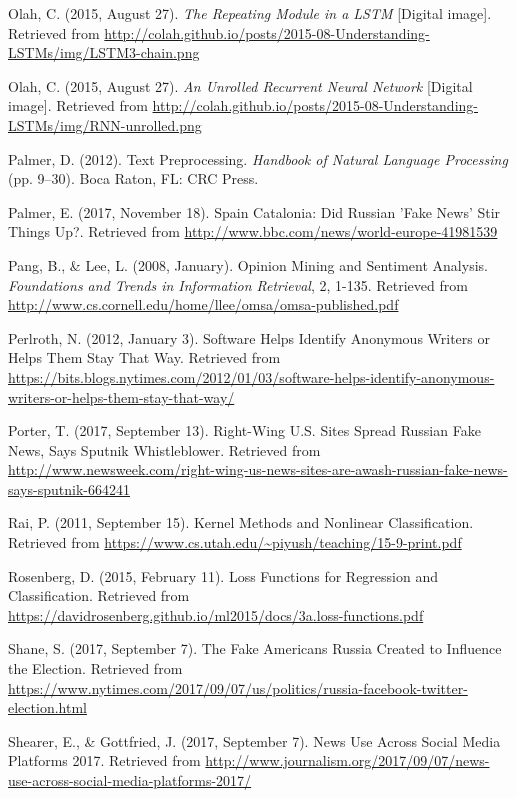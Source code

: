 \begin{thebibliography}{99}
Olah, C. (2015, August 27). \textit{The Repeating Module in a LSTM} [Digital image]. Retrieved from \url{http://colah.github.io/posts/2015-08-Understanding-LSTMs/img/LSTM3-chain.png}

Olah, C. (2015, August 27). \textit{An Unrolled Recurrent Neural Network} [Digital image]. Retrieved from \url{http://colah.github.io/posts/2015-08-Understanding-LSTMs/img/RNN-unrolled.png}

Palmer, D. (2012). Text Preprocessing. \textit{Handbook of Natural Language Processing} (pp. 9–30). Boca Raton, FL: CRC Press.

Palmer, E. (2017, November 18). Spain Catalonia: Did Russian 'Fake News' Stir Things Up?. Retrieved from \url{http://www.bbc.com/news/world-europe-41981539}

Pang, B., \& Lee, L. (2008, January). Opinion Mining and Sentiment Analysis. \textit{Foundations and Trends in Information Retrieval}, 2, 1-135. Retrieved from \url{http://www.cs.cornell.edu/home/llee/omsa/omsa-published.pdf}

Perlroth, N. (2012, January 3). Software Helps Identify Anonymous Writers or Helps Them Stay That Way. Retrieved from \url{https://bits.blogs.nytimes.com/2012/01/03/software-helps-identify-anonymous-writers-or-helps-them-stay-that-way/}

Porter, T. (2017, September 13). Right-Wing U.S. Sites Spread Russian Fake News, Says Sputnik Whistleblower. Retrieved from \url{http://www.newsweek.com/right-wing-us-news-sites-are-awash-russian-fake-news-says-sputnik-664241}

Rai, P. (2011, September 15). Kernel Methods and Nonlinear Classification. Retrieved from \url{https://www.cs.utah.edu/~piyush/teaching/15-9-print.pdf}

Rosenberg, D. (2015, February 11). Loss Functions for Regression and Classification. Retrieved from \url{https://davidrosenberg.github.io/ml2015/docs/3a.loss-functions.pdf}

Shane, S. (2017, September 7). The Fake Americans Russia Created to Influence the Election. Retrieved from \url{https://www.nytimes.com/2017/09/07/us/politics/russia-facebook-twitter-election.html}

Shearer, E., \& Gottfried, J. (2017, September 7). News Use Across Social Media Platforms 2017. Retrieved from \url{http://www.journalism.org/2017/09/07/news-use-across-social-media-platforms-2017/}


\end{thebibliography}
